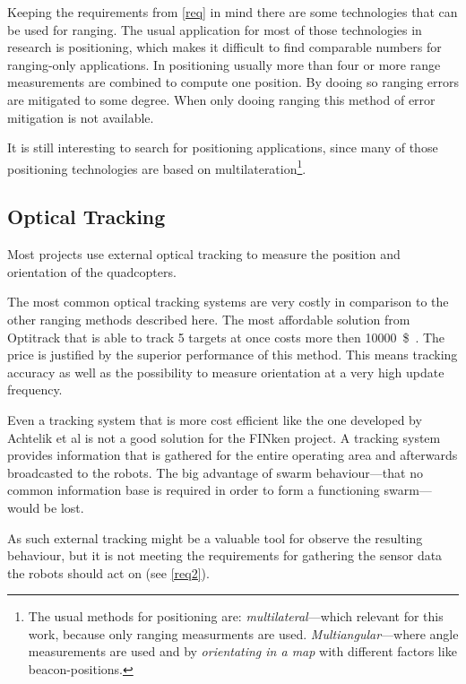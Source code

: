 Keeping the requirements from \autoref{req} in mind  there are some technologies that can be used for ranging.
The usual application for most of those technologies in research is positioning, which makes it difficult to find comparable numbers for ranging-only applications.
In positioning usually more than four or more range measurements are combined to compute one position.
By dooing so ranging errors are mitigated to some degree.
When only dooing ranging this method of error mitigation is not available.

It is still interesting to search for positioning applications, since many of those positioning technologies are based on multilateration\footnote{The usual methods for positioning are: \emph{multilateral}—which relevant for this work, because only ranging measurments are used. \emph{Multiangular}—where angle measurements are used and by \emph{orientating in a map} with different factors like beacon-positions.}.
\cite{_multilateration_2015}

\subsection{Optical Tracking}

Most projects use external optical tracking to measure the position and orientation of the quadcopters. 

The most common optical tracking systems are very costly in comparison to the other ranging methods described here.
The most affordable solution from Optitrack that is able to track 5 targets at once costs more then \SI{10000}{\$}~\cite{optitrack.com}.
The price is justified by the superior performance of this method.
This means tracking accuracy as well as the possibility to measure orientation at a very high update frequency.


Even a tracking system that is more cost efficient like the one developed by Achtelik et al\cite{Achtelik2009} is not a good solution for the FINken project.
A tracking system provides information that is gathered for the entire operating area and afterwards broadcasted to the robots.
The big advantage of swarm behaviour—that no common information base is required in order to form a functioning swarm—would be lost.

As such external tracking might be a valuable tool for observe the resulting behaviour, but it is not meeting the requirements for gathering the sensor data the robots should act on (see \autoref{req2}).

